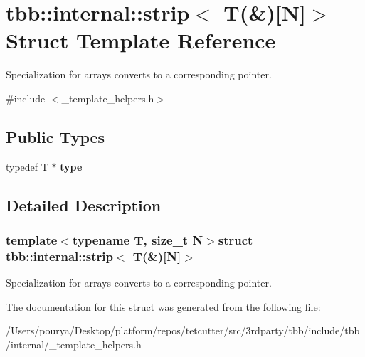 \hypertarget{structtbb_1_1internal_1_1strip_3_01T_07_6_08[N]_4}{}\section{tbb\+:\+:internal\+:\+:strip$<$ T(\&)\mbox{[}N\mbox{]}$>$ Struct Template Reference}
\label{structtbb_1_1internal_1_1strip_3_01T_07_6_08[N]_4}


Specialization for arrays converts to a corresponding pointer.  




{\ttfamily \#include $<$\+\_\+template\+\_\+helpers.\+h$>$}

\subsection*{Public Types}
\begin{DoxyCompactItemize}
\item 
\hypertarget{structtbb_1_1internal_1_1strip_3_01T_07_6_08[N]_4_a16c173beee3a3063085394e0832f78cb}{}typedef T $\ast$ {\bfseries type}\label{structtbb_1_1internal_1_1strip_3_01T_07_6_08[N]_4_a16c173beee3a3063085394e0832f78cb}

\end{DoxyCompactItemize}


\subsection{Detailed Description}
\subsubsection*{template$<$typename T, size\+\_\+t N$>$struct tbb\+::internal\+::strip$<$ T(\&)\mbox{[}\+N\mbox{]}$>$}

Specialization for arrays converts to a corresponding pointer. 

The documentation for this struct was generated from the following file\+:\begin{DoxyCompactItemize}
\item 
/\+Users/pourya/\+Desktop/platform/repos/tetcutter/src/3rdparty/tbb/include/tbb/internal/\+\_\+template\+\_\+helpers.\+h\end{DoxyCompactItemize}
